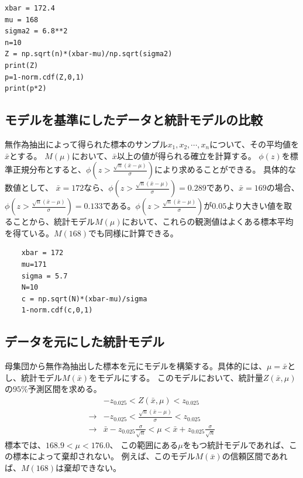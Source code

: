 \begin{lstlisting}
xbar = 172.4
mu = 168
sigma2 = 6.8**2
n=10
Z = np.sqrt(n)*(xbar-mu)/np.sqrt(sigma2)
print(Z)
p=1-norm.cdf(Z,0,1)
print(p*2)
\end{lstlisting}

\subsection{モデルを基準にしたデータと統計モデルの比較}
無作為抽出によって得られた標本のサンプル$x_1,x_2,\cdots,x_n$について、その平均値を$\bar{x}$とする。
$M(\mu)$において、$\bar{x}$以上の値が得られる確立を計算する。
$\phi(z)$を標準正規分布とすると、$\phi(z>\frac{\sqrt{n}(\bar{x}-\mu)}{\sigma})$により求めることができる。
具体的な数値として、
$\bar{x}=172$なら、$\phi(z>\frac{\sqrt{n}(\bar{x}-\mu)}{\sigma}) = 0.289$であり、$\bar{x}=169$の場合、$\phi(z>\frac{\sqrt{n}(\bar{x}-\mu)}{\sigma}) = 0.133$である。$\phi(z>\frac{\sqrt{n}(\bar{x}-\mu)}{\sigma})$が$0.05$より大きい値を取ることから、統計モデル$M(\mu)$において、これらの観測値はよくある標本平均を得ている。$M(168)$でも同様に計算できる。

\begin{lstlisting}
    xbar = 172
    mu=171
    sigma = 5.7
    N=10
    c = np.sqrt(N)*(xbar-mu)/sigma
    1-norm.cdf(c,0,1)
\end{lstlisting}


\subsection{データを元にした統計モデル}
母集団から無作為抽出した標本を元にモデルを構築する。具体的には、$\mu=\bar{x}$とし、統計モデル$M(\bar{x})$をモデルにする。
このモデルにおいて、統計量$Z(\bar{x},\mu)$の$95\%$予測区間を求める。
\begin{eqnarray*}
 & -z_{0.025} < Z(\bar{x},\mu)<z_{0.025} \\
\rightarrow & -z_{0.025} < \frac{\sqrt{n}(\bar{x}-\mu)}{\sigma}  <z_{0.025} \\
\rightarrow & \bar{x}- z_{0.025}\frac{\sigma}{\sqrt{n}} < \mu < \bar{x} + z_{0.025}\frac{\sigma}{\sqrt{n}}
\end{eqnarray*}
標本では、$168.9 < \mu < 176.0$、
この範囲にある$\mu$をもつ統計モデルであれば、この標本によって棄却されない。
例えば、このモデル$M(\bar{x})$の信頼区間であれば、$M(168)$は棄却できない。

